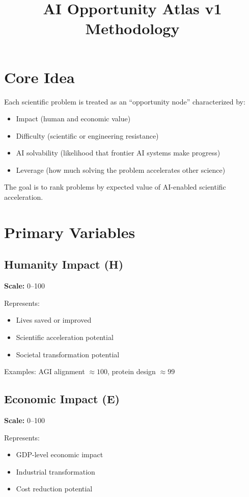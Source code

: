 \documentclass[11pt]{article}
\title{AI Opportunity Atlas v1\\Methodology}
\author{}
\date{}
\begin{document}
\maketitle

\section{Core Idea}

Each scientific problem is treated as an ``opportunity node'' characterized by:

\begin{itemize}
    \item Impact (human and economic value)
    \item Difficulty (scientific or engineering resistance)
    \item AI solvability (likelihood that frontier AI systems make progress)
    \item Leverage (how much solving the problem accelerates other science)
\end{itemize}

The goal is to rank problems by expected value of AI-enabled scientific acceleration.

\section{Primary Variables}

\subsection{Humanity Impact (H)}
\textbf{Scale:} 0--100

Represents:
\begin{itemize}
    \item Lives saved or improved
    \item Scientific acceleration potential
    \item Societal transformation potential
\end{itemize}

Examples:
AGI alignment $\approx 100$, protein design $\approx 99$

\subsection{Economic Impact (E)}
\textbf{Scale:} 0--100

Represents:
\begin{itemize}
    \item GDP-level economic impact
    \item Industrial transformation
    \item Cost reduction potential
\end{itemize}
\end{document}
